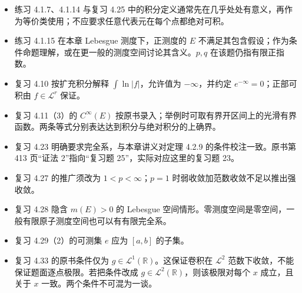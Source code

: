 \documentclass[11pt,a4paper]{article}
\providecommand{\tightlist}{\setlength{\itemsep}{3pt}\setlength{\parskip}{0pt}}
\begin{document}
\begin{itemize}
\tightlist
\item
  练习 4.1.7、4.1.14 与复习 4.25
  中的积分定义通常先在几乎处处有意义，再作为等价类使用；不应要求任意代表元在每个点都绝对可积。
\item
  练习 4.1.15 在本章 Lebesgue 测度下，正测度的 \(E\)
  不满足其包含假设；作为条件命题理解，或在更一般的测度空间讨论其含义。\(p,q\)
  在该题仍指有限正指数。
\item
  复习 4.10 按扩充积分解释 \(\int\ln|f|\)，允许值为 \(-\infty\)，并约定
  \(e^{-\infty}=0\)；正部可积由 \(f\in\mathcal L^r\) 保证。
\item
  复习 4.11（3）的 \(C^\infty(E)\)
  按原书录入；举例时可取有界开区间上的光滑有界函数。两条等式分别表达达到积分与绝对积分的上确界。
\item
  复习 4.23 明确要求完全系，与本章讲义对定理 4.2.9
  的条件校注一致。原书第 413 页``证法 2''指向``复习题
  25''，实际对应这里的复习题 23。
\item
  复习 4.27 的推广须改为 \(1<p<\infty\)；\(p=1\)
  时弱收敛加范数收敛不足以推出强收敛。
\item
  复习 4.28 隐含 \(m(E)>0\) 的 Lebesgue
  空间情形。零测度空间是零空间，一般有限原子测度空间也可以有有限完全系。
\item
  复习 4.29（2）的可测集 \(e\) 应为 \([a,b]\) 的子集。
\item
  复习 4.33 的原书条件仅为 \(g\in\mathcal L^1(\mathbb R)\)。这保证卷积在
  \(\mathcal L^2\) 范数下收敛，不能保证题面逐点极限。若把条件改成
  \(g\in\mathcal L^2(\mathbb R)\)，则该极限对每个 \(x\) 成立，且关于
  \(x\) 一致。两个条件不可混为一谈。
\end{itemize}
\end{document}
